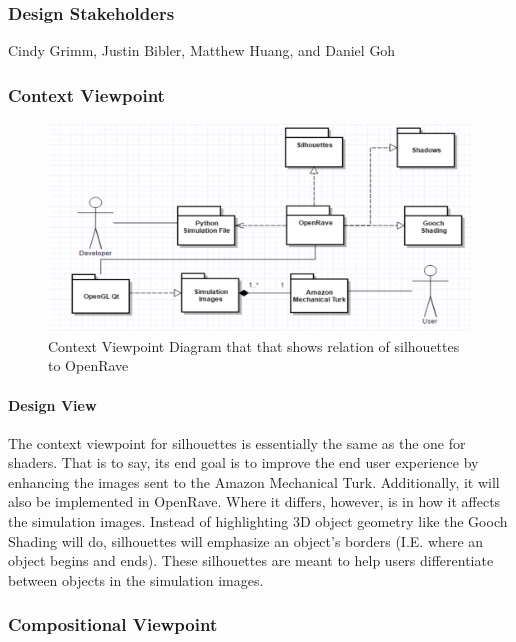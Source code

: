 \begin{flushleft}
\subsubsection{Design Stakeholders}
Cindy Grimm, Justin Bibler, Matthew Huang, and Daniel Goh

\subsubsection{Context Viewpoint}

\begin{figure} [H]
  \includegraphics[scale=0.8]{designdoc_v1/Silhouettes_context.eps}
  \caption
{ \newline \hspace{\linewidth}
Context Viewpoint Diagram that that shows relation of silhouettes to OpenRave}
  \label{fig:Silhouettes_context}
\end{figure}

\paragraph{Design View}
The context viewpoint for silhouettes is essentially the same as the one for shaders.
That is to say, its end goal is to improve the end user experience by enhancing the images sent to the Amazon Mechanical Turk.
Additionally, it will also be implemented in OpenRave.
Where it differs, however, is in how it affects the simulation images.
Instead of highlighting 3D object geometry like the Gooch Shading will do, silhouettes will emphasize an object's borders (I.E. where an object begins and ends).
These silhouettes are meant to help users differentiate between objects in the simulation images.

\subsubsection{Compositional Viewpoint}


\end{flushleft}

